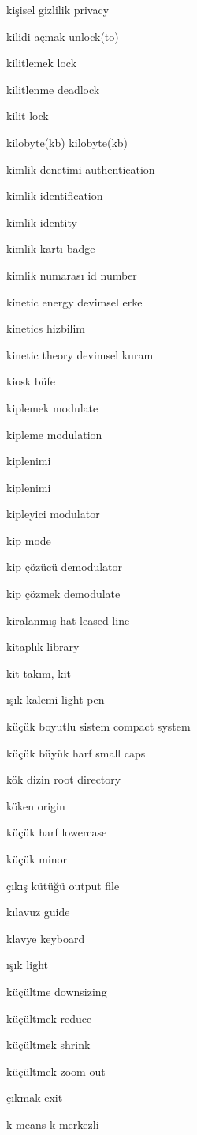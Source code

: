 \documentclass[12pt,fleqn]{article}\usepackage{../../common}
\begin{document}
kişisel gizlilik privacy

kilidi açmak unlock(to)

kilitlemek lock

kilitlenme deadlock

kilit lock

kilobyte(kb) kilobyte(kb)

kimlik denetimi authentication

kimlik identification

kimlik identity

kimlik kartı badge

kimlik numarası id number

kinetic energy devimsel erke

kinetics hizbilim

kinetic theory devimsel kuram

kiosk büfe

kiplemek modulate

kipleme modulation

kiplenimi

kiplenimi

kipleyici modulator

kip mode

kip çözücü demodulator

kip çözmek demodulate

kiralanmış hat leased line

kitaplık library

kit takım, kit

ışık kalemi light pen

küçük boyutlu sistem compact system

küçük büyük harf small caps

kök dizin root directory

köken origin

küçük harf lowercase

küçük minor

çıkış kütüğü output file

kılavuz guide

klavye keyboard

ışık light

küçültme downsizing

küçültmek reduce

küçültmek shrink

küçültmek zoom out

çıkmak exit

k-means k merkezli
\end{document}
